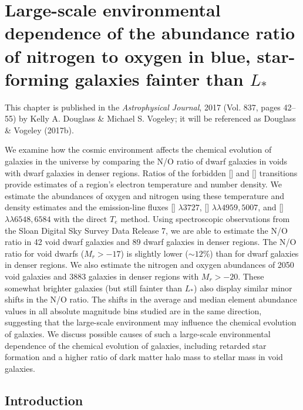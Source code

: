 \chapter[N/O ratio in dwarf galaxies]{Large-scale environmental dependence of the abundance ratio of nitrogen to oxygen in blue, star-forming galaxies fainter than $L_*$}\label{ch:Paper2}


This chapter is published in the \emph{Astrophysical Journal}, 2017 (Vol. 837, 
pages 42--55) by Kelly A. Douglass \& Michael S. Vogeley; it will be referenced 
as Douglass \& Vogeley (2017b).

\begin{chapabstract}
We examine how the cosmic environment affects the chemical evolution of galaxies 
in the universe by comparing the N/O ratio of dwarf galaxies in voids with 
dwarf galaxies in denser regions.  Ratios of the forbidden [] and 
[] transitions provide estimates of a region's electron temperature 
and number density.  We estimate the abundances of oxygen and nitrogen using 
these temperature and density estimates and the emission-line fluxes 
[] $\lambda 3727$, [] $\lambda \lambda 4959, 5007$, and 
[] $\lambda \lambda 6548, 6584$ with the direct $T_e$ method.  Using 
spectroscopic observations from the Sloan Digital Sky Survey Data Release 7, we 
are able to estimate the N/O ratio in 42 void dwarf galaxies and 89 dwarf 
galaxies in denser regions.  The N/O ratio for void dwarfs ($M_r > -17$) is 
slightly lower ($\sim 12\%$) than for dwarf galaxies in denser regions.   We 
also estimate the nitrogen and oxygen abundances of 2050 void galaxies and 3883 
galaxies in denser regions with $M_r > -20$.  These somewhat brighter galaxies 
(but still fainter than $L_*$) also display similar minor shifts in the N/O 
ratio.  The shifts in the average and median element abundance values in all 
absolute magnitude bins studied are in the same direction, suggesting that the 
large-scale environment may influence the chemical evolution of galaxies.  We 
discuss possible causes of such a large-scale environmental dependence of the 
chemical evolution of galaxies, including retarded star formation and a higher 
ratio of dark matter halo mass to stellar mass in void galaxies.
\end{chapabstract}


%
%
\section{Introduction}

